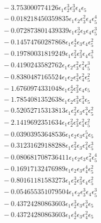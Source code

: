 \documentclass[10pt]{article}
\begin{document}
\begin{align*}
&{}  - 3.753000774126 \epsilon_{1} \epsilon_{2}^{3} \epsilon_{3}^{3} \epsilon_{4} \epsilon_{5} \\
&{}  - 0.018218450359835 \epsilon_{1} \epsilon_{2} \epsilon_{3}^{2} \epsilon_{4} \epsilon_{5}^{4} \\
&{}  - 0.072873801439339 \epsilon_{1} \epsilon_{2}^{3} \epsilon_{3} \epsilon_{4} \epsilon_{5}^{3} \\
&{}  - 0.14574760287868 \epsilon_{1} \epsilon_{2}^{4} \epsilon_{3} \epsilon_{4} \epsilon_{5}^{2} \\
&{}  - 0.19780031819249 \epsilon_{1} \epsilon_{2}^{2} \epsilon_{3}^{2} \epsilon_{4} \epsilon_{5}^{3} \\
&{}  - 0.4190243582762 \epsilon_{1} \epsilon_{2} \epsilon_{3}^{2} \epsilon_{4}^{2} \epsilon_{5}^{3} \\
&{}  - 0.8380487165524 \epsilon_{1} \epsilon_{2} \epsilon_{3}^{3} \epsilon_{4}^{2} \epsilon_{5}^{2} \\
&{}  - 1.6760974331048 \epsilon_{1} \epsilon_{2}^{4} \epsilon_{3}^{2} \epsilon_{4} \epsilon_{5} \\
&{}  - 1.7854081352638 \epsilon_{1} \epsilon_{2} \epsilon_{3}^{3} \epsilon_{4}^{3} \epsilon_{5} \\
&{}  - 0.52052715313813 \epsilon_{1} \epsilon_{2}^{2} \epsilon_{3} \epsilon_{4}^{3} \epsilon_{5}^{2} \\
&{}  - 2.1419692351634 \epsilon_{1} \epsilon_{2}^{2} \epsilon_{3}^{2} \epsilon_{4}^{2} \epsilon_{5}^{2} \\
&{}  - 0.03903953648536 \epsilon_{1} \epsilon_{2} \epsilon_{3} \epsilon_{4}^{5} \epsilon_{5} \\
&{}  - 0.31231629188288 \epsilon_{1} \epsilon_{2}^{2} \epsilon_{3} \epsilon_{4}^{2} \epsilon_{5}^{3} \\
&{}  - 0.080681708736411 \epsilon_{1} \epsilon_{2} \epsilon_{3} \epsilon_{4}^{2} \epsilon_{5}^{4} \\
&{}  - 0.16917132476989 \epsilon_{1} \epsilon_{2} \epsilon_{3} \epsilon_{4}^{4} \epsilon_{5}^{2} \\
&{}  - 0.80161181583273 \epsilon_{1} \epsilon_{2}^{3} \epsilon_{3}^{2} \epsilon_{4} \epsilon_{5}^{2} \\
&{}  - 0.054655351079504 \epsilon_{1} \epsilon_{2} \epsilon_{3}^{3} \epsilon_{4} \epsilon_{5}^{3} \\
&{}  - 0.43724280863603 \epsilon_{1} \epsilon_{2}^{3} \epsilon_{3} \epsilon_{4}^{3} \epsilon_{5} \\
&{}  - 0.43724280863603 \epsilon_{1} \epsilon_{2}^{4} \epsilon_{3} \epsilon_{4}^{2} \epsilon_{5} \\

\end{align*}
\end{document}
